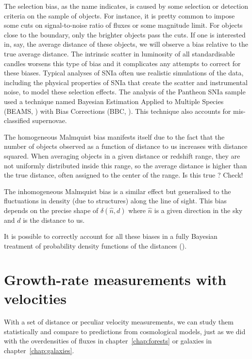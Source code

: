 The selection bias, as the name indicates, is caused by some selection or detection criteria 
on the sample of objects. For instance, it is pretty common to impose some cuts on signal-to-noise 
ratio of fluxes or some magnitude limit. For objects close to the boundary, only 
the brighter objects pass the cuts. If one is interested in, say, the average distance of these objects, 
we will observe a bias relative to the true average distance. 
The intrinsic scatter in luminosity of all standardisable candles worsens this type of bias 
and it complicates any attempts to correct for these biases. 
Typical analyses of SNIa often use realistic simulations of the data, including the physical 
properties of SNIa that create the scatter and instrumental noise, to model these selection effects. 
The analysis of the Pantheon SNIa sample used a technique named 
Bayesian Estimation Applied to Multiple Species (BEAMS, \cite{kunzBayesianEstimationApplied2007}) 
with Bias Corrections 
(BBC, \cite{kesslerCorrectingTypeIa2017}). This technique also accounts for mis-classified supernovae. 

The homogeneous Malmquist bias manifests itself due to the fact that the number of objects 
observed as a function of distance to us increases with distance squared. When averaging 
objects in a given distance or redshift range, they are not uniformly distributed inside this range,
so the average distance is higher than the true distance, often assigned to the center of the range. 
Is this true ? Check! 
 
The inhomogeneous Malmquist bias is a similar effect but generalised to the fluctuations in density 
(due to structures) along the line of sight. This bias depends on the precise shape of $\delta(\hat{n}, d)$
where $\hat{n}$ is a given direction in the sky and $d$ is the distance to us. 

It is possible to correctly account for all these biases in a fully Bayesian treatment of  
probability density functions of the distances 
(\cite{grazianiPeculiarVelocityField2019, boruahReconstructingDarkMatter2021}). 

\section{Growth-rate measurements with velocities}
\label{velocities:methods}


With a set of distance or peculiar velocity measurements, 
we can study them statistically and compare to predictions from 
cosmological models, just as we did with the overdensities of fluxes 
in chapter~\ref{chap:forests} or galaxies in chapter~\ref{chap:galaxies}. 

